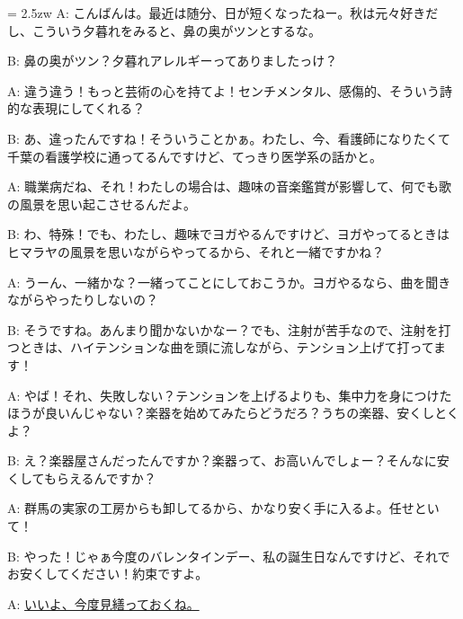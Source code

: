 \documentclass[11pt]{amsart}
\title{}
\author{}
\newenvironment{hangall}[1]{\hangindent = 2.5zw\everypar{\hangindent = 2.5zw}}{}
\begin{document}
\maketitle
\begin{hangall}{}%
A: こんばんは。最近は随分、日が短くなったねー。秋は元々好きだし、こういう夕暮れをみると、鼻の奥がツンとするな。

B: 鼻の奥がツン？夕暮れアレルギーってありましたっけ？

A: 違う違う！もっと芸術の心を持てよ！センチメンタル、感傷的、そういう詩的な表現にしてくれる？

B: あ、違ったんですね！そういうことかぁ。わたし、今、看護師になりたくて千葉の看護学校に通ってるんですけど、てっきり医学系の話かと。

A: 職業病だね、それ！わたしの場合は、趣味の音楽鑑賞が影響して、何でも歌の風景を思い起こさせるんだよ。

B: わ、特殊！でも、わたし、趣味でヨガやるんですけど、ヨガやってるときはヒマラヤの風景を思いながらやってるから、それと一緒ですかね？

A: うーん、一緒かな？一緒ってことにしておこうか。ヨガやるなら、曲を聞きながらやったりしないの？

B: そうですね。あんまり聞かないかなー？でも、注射が苦手なので、注射を打つときは、ハイテンションな曲を頭に流しながら、テンション上げて打ってます！

A: やば！それ、失敗しない？テンションを上げるよりも、集中力を身につけたほうが良いんじゃない？楽器を始めてみたらどうだろ？うちの楽器、安くしとくよ？

B: え？楽器屋さんだったんですか？楽器って、お高いんでしょー？そんなに安くしてもらえるんですか？

A: 群馬の実家の工房からも卸してるから、かなり安く手に入るよ。任せといて！

B: やった！じゃぁ今度のバレンタインデー、私の誕生日なんですけど、それでお安くしてください！約束ですよ。

A: \ul{いいよ、今度見繕っておくね。}\end{hangall}
\end{document}

